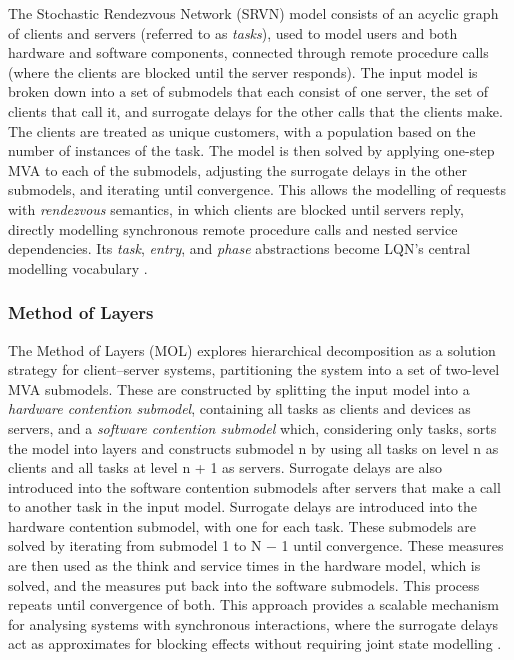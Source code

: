 The Stochastic Rendezvous Network (SRVN) model \cite{woodside89} consists of an acyclic graph of clients and servers (referred to as \textit{tasks}), used to model users and both hardware and software components, connected through remote procedure calls (where the clients are blocked until the server responds). The input model is broken down into a set of submodels that each consist of one server, the set of clients that call it, and surrogate delays for the other calls that the clients make. The clients are treated as unique customers, with a population based on the number of instances of the task. The model is then solved by applying one-step MVA to each of the submodels, adjusting the surrogate delays in the other submodels, and iterating until convergence. This allows the modelling of requests with \textit{rendezvous} semantics, in which clients are blocked until servers reply, directly modelling synchronous remote procedure calls and nested service dependencies. Its \textit{task}, \textit{entry}, and \textit{phase} abstractions become LQN's central modelling vocabulary \cite{woodside95,franks99}.

\subsubsection*{Method of Layers}

The Method of Layers (MOL) \cite{rolia95} explores hierarchical decomposition as a solution strategy for client–server systems, partitioning the system into a set of two-level MVA submodels. These are constructed by splitting the input model into a \textit{hardware contention submodel}, containing all tasks as clients and devices as servers, and a \textit{software contention submodel} which, considering only tasks, sorts the model into layers and constructs submodel n by using all tasks on level n as clients and all tasks at level n + 1 as servers. Surrogate delays are also introduced into the software contention submodels after servers that make a call to another task in the input model. Surrogate delays are introduced into the hardware contention submodel, with one for each task. These submodels are solved by iterating from submodel 1 to N − 1 until convergence. These measures are then used as the think and service times in the hardware model, which is solved, and the measures put back into the software submodels. This process repeats until convergence of both. This approach provides a scalable mechanism for analysing systems with synchronous interactions, where the surrogate delays act as approximates for blocking effects without requiring joint state modelling \cite{franks99,rolia95}.

